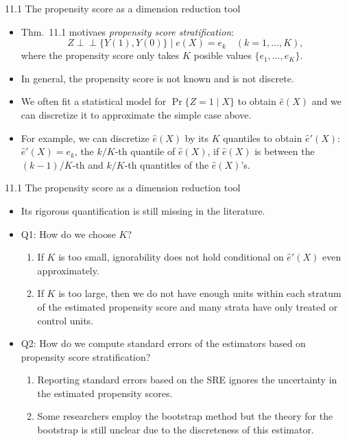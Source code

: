 \documentclass[aspectratio=169, 12pt]{beamer}
\newcommand{\indep}{\perp\!\!\!\perp}
\begin{document}
\begin{frame}{11.1 The propensity score as a dimension reduction tool}
  \begin{itemize}
    \item Thm.~11.1 motivaes \textit{propensity score stratification}:
    \[
    Z\indep\{Y(1),Y(0)\}\mid e(X)=e_k\quad (k=1,\dots,K),
    \]
    where the propensity score only takes $K$ posible values $\{e_1,\dots,e_K\}.$
    \item In general, the propensity score is not known and is not discrete. 
    \item We often fit a statistical model for $\Pr\{Z=1\mid X\}$ to obtain $\hat{e}(X)$ and we can discretize it to approximate the simple case above.
    \item For example, we can discretize $\hat{e}(X)$ by its $K$ quantiles to obtain $\hat{e}'(X)$: $\hat{e}'(X)=e_k$, the $k/K$-th quantile of $\hat{e}(X)$, if $\hat{e}(X)$ is between the $(k-1)/K$-th and $k/K$-th quantitles of the $\hat{e}(X)$'s.
  \end{itemize}
\end{frame}

\begin{frame}{11.1 The propensity score as a dimension reduction tool}
  \begin{itemize}
    \item Its rigorous quantification is still missing in the literature.
    \item Q1: How do we choose $K$?
    \begin{enumerate}
      \item If $K$ is too small, ignorability does not hold conditional on $\hat{e}'(X)$ even approximately.
      \item If $K$ is too large, then we do not have enough units within each stratum of the estimated propensity score and many strata have only treated or control units.
    \end{enumerate}
    \item Q2: How do we compute standard errors of the estimators based on propensity score stratification?
    \begin{enumerate}
      \item Reporting standard errors based on the SRE ignores the uncertainty in the estimated propensity scores.
      \item Some researchers employ the bootstrap method but the theory for the bootstrap is still unclear due to the discreteness of this estimator.
    \end{enumerate}
  \end{itemize}
\end{frame}
\end{document}
